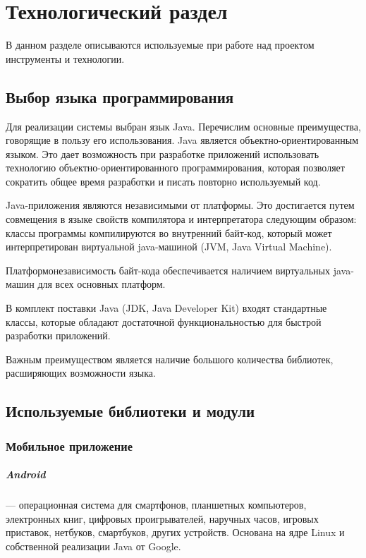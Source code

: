 \chapter{Технологический раздел}
\label{cha:impl}

В данном разделе описываются используемые при работе над проектом инструменты и технологии.

\section{Выбор языка программирования}

Для реализации системы выбран язык Java. Перечислим основные преимущества, говорящие в пользу его использования.
Java является объектно-ориентированным языком. Это дает возможность при разработке приложений использовать технологию объектно-ориентированного программирования, которая позволяет сократить общее время разработки и писать повторно используемый код.

Java-приложения являются независимыми от платформы. Это достигается путем совмещения в языке свойств компилятора и интерпретатора следующим образом: классы программы компилируются во внутренний байт-код, который может интерпретирован виртуальной java-машиной (JVM, Java Virtual Machine). 

Платформонезависимость байт-кода обеспечивается наличием виртуальных java-машин для всех основных платформ.

В комплект поставки Java (JDK, Java Developer Kit) входят стандартные классы, которые обладают достаточной функциональностью для быстрой разработки приложений.

Важным преимуществом является наличие большого количества библиотек, расширяющих возможности языка.

\section{Используемые библиотеки и модули}
\subsection{Мобильное приложение}

\paragraph{Android} — операционная система для смартфонов, планшетных компьютеров, электронных книг, цифровых проигрывателей, наручных часов, игровых приставок, нетбуков, смартбуков, других устройств. Основана на ядре Linux и собственной реализации Java от Google. 

